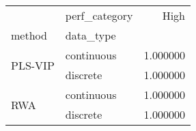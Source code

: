 \begin{tabular}{llr}
\toprule
 & perf_category & High \\
method & data_type &  \\
\midrule
\multirow[t]{2}{*}{PLS-VIP} & continuous & 1.000000 \\
 & discrete & 1.000000 \\
\cline{1-3}
\multirow[t]{2}{*}{RWA} & continuous & 1.000000 \\
 & discrete & 1.000000 \\
\cline{1-3}
\bottomrule
\end{tabular}
